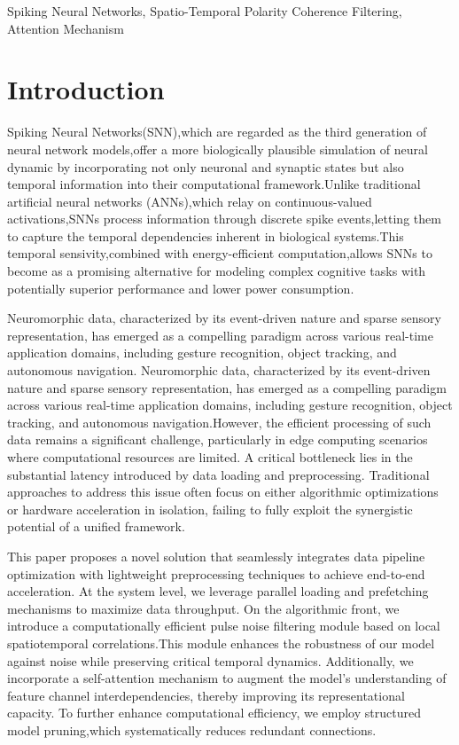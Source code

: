 \documentclass[conference]{IEEEtran}
\begin{document}
\begin{IEEEkeywords}
Spiking Neural Networks, Spatio-Temporal Polarity Coherence Filtering, Attention Mechanism
\end{IEEEkeywords}

\section{Introduction}
Spiking Neural Networks(SNN),which are regarded as the third generation of neural network models,offer a more biologically plausible simulation of neural dynamic by incorporating not only neuronal and synaptic states but also temporal information into their computational framework\cite{b3,10.5555}.Unlike traditional artificial neural networks (ANNs),which relay on continuous-valued activations,SNNs process information through discrete spike events,letting them to capture the temporal dependencies inherent in biological systems.This temporal sensivity,combined with energy-efficient computation,allows SNNs to become as a promising alternative for modeling complex cognitive tasks with potentially superior performance and lower power consumption\cite{roy2019towards}.

Neuromorphic data, characterized by its event-driven nature and sparse sensory representation, has emerged as a compelling paradigm across various real-time application domains, including gesture recognition, object tracking, and autonomous navigation. Neuromorphic data, characterized by its event-driven nature and sparse sensory representation, has emerged as a compelling paradigm across various real-time application domains, including gesture recognition, object tracking, and autonomous navigation.However, the efficient processing of such data remains a significant challenge, particularly in edge computing scenarios where computational resources are limited. A critical bottleneck lies in the substantial latency introduced by data loading and preprocessing. Traditional approaches to address this issue often focus on either algorithmic optimizations or hardware acceleration in isolation, failing to fully exploit the synergistic potential of a unified framework\cite{ding2024}.

This paper proposes a novel solution that seamlessly integrates data pipeline optimization with lightweight preprocessing techniques to achieve end-to-end acceleration. At the system level, we leverage parallel loading and prefetching mechanisms to maximize data throughput. On the algorithmic front, we introduce a computationally efficient pulse noise filtering module based on local spatiotemporal correlations.This module enhances the robustness of our model against noise while preserving critical temporal dynamics. Additionally, we incorporate a self-attention mechanism to augment the model's understanding of feature channel interdependencies, thereby improving its representational capacity\cite{hu2019}. To further enhance computational efficiency, we employ structured model pruning,which systematically reduces redundant connections\cite{han2015}.
\end{document}
